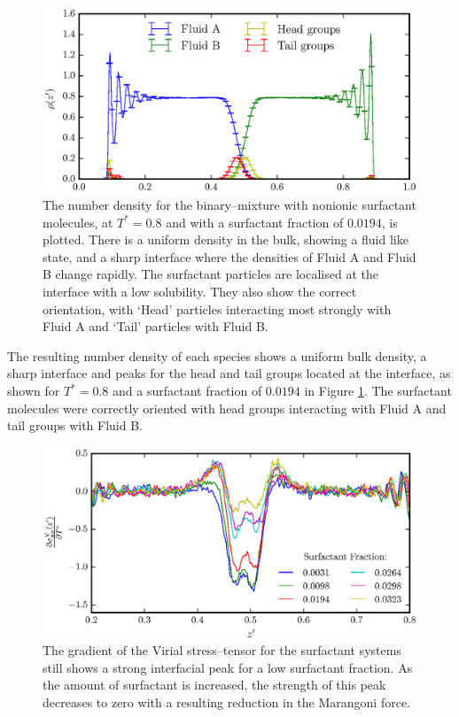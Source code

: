 \begin{figure}[h]
\centering
\includegraphics[scale=0.8]{SurfRho}
\caption{The number density for the binary--mixture with nonionic surfactant molecules, at  $T^{*}=0.8$ and with a surfactant fraction of $0.0194$, is plotted.
There is a uniform density in the bulk, showing a fluid like state, and a sharp interface where the densities of Fluid A and Fluid B change rapidly.
The surfactant particles are localised at the interface with a low solubility.
They also show the correct orientation, with `Head' particles interacting most strongly with Fluid A and `Tail' particles with Fluid B.
}
\label{SurfRho}
\end{figure}

The resulting number density of each species shows a uniform bulk density, a sharp interface and peaks for the head and tail groups located at the interface, as shown for $T^{*}=0.8$ and a surfactant fraction of $0.0194$ in Figure \ref{SurfRho}.
The surfactant molecules were correctly oriented with head groups interacting with Fluid A and tail groups with Fluid B.
\FloatBarrier

\begin{figure}[h]
\centering
\includegraphics[scale=0.8]{SurfForce}
\caption{The gradient of the Virial stress--tensor for the surfactant systems still shows a strong interfacial peak for a low surfactant fraction.
As the amount of surfactant is increased, the strength of this peak decreases to zero with a resulting reduction in the Marangoni force.
}
\label{SurfForce}
\end{figure}

